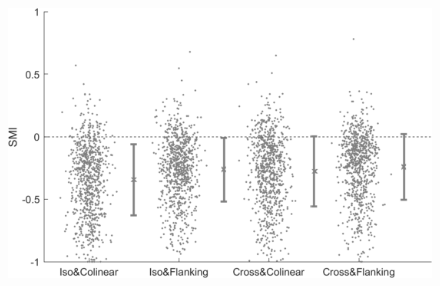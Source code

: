 \begin{figure}[H] \centering \includegraphics[width=12cm,height=12cm,keepaspectratio]{Figures/7.Results/finalPopulation/sel/popPlots_VisROIs_Cor_2SalignmentAngle.png} 
\end{figure}

% 
%    
%           
%
%        

